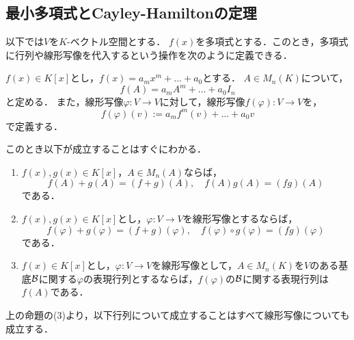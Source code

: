 \subsection{最小多項式とCayley-Hamiltonの定理}
以下では$V$を$K$-ベクトル空間とする．
$f(x)$を多項式とする．このとき，多項式に行列や線形写像を代入するという操作を次のように定義できる．
\begin{dfn}
    $f(x) \in K[x]$とし，$f(x)=a_m x^m + \dots + a_0$とする．
    $A \in M_n(K)$について，
    \[
        f(A) = a_m A^m + \dots + a_0 I_n
    \]
    と定める．
    また，線形写像$\varphi \colon V \to V$に対して，線形写像$f(\varphi) \colon V \to V$を，
    \[
        f(\varphi)(v) := a_m f^m(v) + \dots + a_0 v    
    \]
    で定義する．
\end{dfn}
このとき以下が成立することはすぐにわかる．
\begin{prop}
    \begin{enumerate}
        \item $f(x),g(x)\in K[x]$，$A \in M_n(A)$ならば，
        \[
            f(A) + g(A) = (f+g)(A), \quad f(A)g(A) = (fg)(A)    
        \]
        である．
        \item $f(x),g(x)\in K[x]$とし，$\varphi \colon V \to V$を線形写像とするならば，
        \[
            f(\varphi) + g(\varphi) = (f+g)(\varphi), \quad f(\varphi)\circ g(\varphi) = (fg)(\varphi)    
        \]
        である．
        \item $f(x) \in K[x]$とし，$\varphi \colon V \to V$を線形写像として，$A \in M_n(K)$を$V$のある基底$\mathcal{B}$に関する$\varphi$の表現行列とするならば，$f(\varphi)$の$\mathcal{B}$に関する表現行列は$f(A)$である．
    \end{enumerate}
\end{prop}
上の命題の(3)より，以下行列について成立することはすべて線形写像についても成立する．


